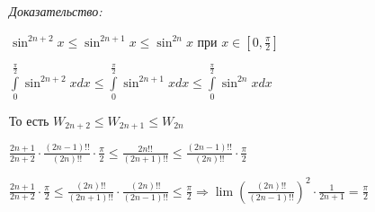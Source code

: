 \documentclass[12pt]{article}
\begin{document}
\textit{Доказательство:}

$\sin^{2n + 2}x \leq \sin^{2n + 1}x \leq \sin^{2n}x$ при $x \in [0, \frac{\pi}{2}]$

$\int\limits_0^\frac{\pi}{2} \sin^{2n + 2}x dx \leq \int\limits_0^\frac{\pi}{2} \sin^{2n + 1}x dx \leq \int\limits_0^\frac{\pi}{2} \sin^{2n}x dx$

То есть $W_{2n + 2} \leq W_{2n + 1} \leq W_{2n}$

$\frac{2n + 1}{2n + 2} \cdot \frac{(2n - 1)!!}{(2n)!!} \cdot \frac{\pi}{2} \leq \frac{2n!!}{(2n + 1)!!} \leq \frac{(2n - 1)!!}{(2n)!!} \cdot \frac{\pi}{2}$

$\frac{2n + 1}{2n + 2} \cdot \frac{\pi}{2} \leq \frac{(2n)!!}{(2n + 1)!!} \cdot \frac{(2n)!!}{(2n - 1)!!} \leq \frac{\pi}{2} \Rightarrow \lim (\frac{(2n)!!}{(2n - 1)!!})^2 \cdot \frac{1}{2n + 1} = \frac{\pi}{2}$
\end{document}
